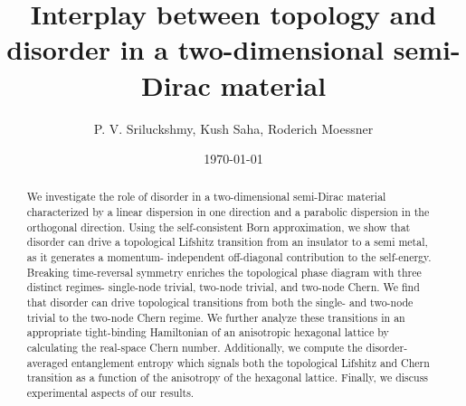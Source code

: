 \documentclass[aps,prb,showpacs,twocolumn,floats]{revtex4-1}
\begin{document}
\title {Interplay between topology and disorder in a two-dimensional semi-Dirac material}
\author{P. V. Sriluckshmy, Kush Saha, Roderich Moessner}
\date{\today}
\begin{abstract}
We investigate the role of disorder in a two-dimensional semi-Dirac material characterized by a linear dispersion in one direction and a parabolic dispersion in the orthogonal direction. Using the self-consistent Born approximation, we show that disorder can drive a topological Lifshitz transition from an insulator to a semi metal, as it generates a momentum- independent off-diagonal contribution to the self-energy. Breaking time-reversal symmetry enriches the topological phase diagram with three distinct regimes- single-node trivial, two-node trivial, and two-node Chern. We find that disorder can drive topological transitions from both the single- and two-node trivial to the two-node Chern regime. We further analyze these transitions in an appropriate tight-binding Hamiltonian of an anisotropic hexagonal lattice by calculating the real-space Chern number. Additionally, we compute the disorder-averaged entanglement entropy  which signals  both the topological Lifshitz and Chern transition as a function of the anisotropy of the hexagonal lattice. Finally, we discuss experimental aspects of our results. 
\end{abstract}

\maketitle
\end{document}

